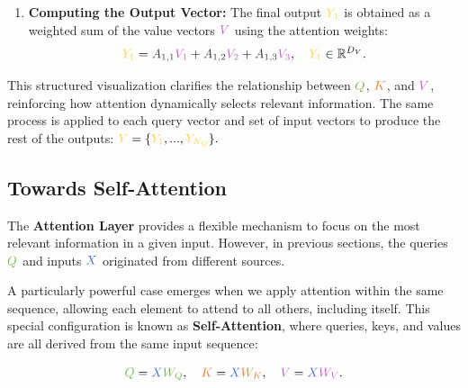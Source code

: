 \begin{enumerate}
    \item \textbf{Computing the Output Vector:} The final output \(\textcolor[rgb]{1.0,0.816,0.267}{Y_1}\) is obtained as a weighted sum of the value vectors \(\textcolor[rgb]{0.769,0.369,0.800}{V}\) using the attention weights:
    \begin{equation}
        \textcolor[rgb]{1.0,0.816,0.267}{Y_1} = \textcolor[rgb]{0.236,0.236,0.236}{A_{1,1}} \textcolor[rgb]{0.769,0.369,0.800}{V_1} + \textcolor[rgb]{0.236,0.236,0.236}{A_{1,2}} \textcolor[rgb]{0.769,0.369,0.800}{V_2} + \textcolor[rgb]{0.236,0.236,0.236}{A_{1,3}} \textcolor[rgb]{0.769,0.369,0.800}{V_3}, \quad \textcolor[rgb]{1.0,0.816,0.267}{Y_1} \in \mathbb{R}^{D_V}.
    \end{equation}
\end{enumerate}

\noindent This structured visualization clarifies the relationship between \(\textcolor[rgb]{0.471,0.694,0.318}{Q}\), \(\textcolor[rgb]{0.929,0.502,0.212}{K}\), and \(\textcolor[rgb]{0.769,0.369,0.800}{V}\), reinforcing how attention dynamically selects relevant information. The same process is applied to each query vector and set of input vectors to produce the rest of the outputs: $\textcolor[rgb]{1.0,0.816,0.267}{Y} = \{\textcolor[rgb]{1.0,0.816,0.267}{Y_1}, ..., \textcolor[rgb]{1.0,0.816,0.267}{Y_{N_Q}}\}.$


\subsection{Towards Self-Attention}
\noindent The \textbf{Attention Layer} provides a flexible mechanism to focus on the most relevant information in a given input. However, in previous sections, the queries \(\textcolor[rgb]{0.471,0.694,0.318}{Q}\) and inputs \(\textcolor[rgb]{0.267,0.447,0.769}{X}\) originated from different sources. 

\noindent A particularly powerful case emerges when we apply attention within the same sequence, allowing each element to attend to all others, including itself. This special configuration is known as \textbf{Self-Attention}, where queries, keys, and values are all derived from the same input sequence:

\[
\textcolor[rgb]{0.471,0.694,0.318}{Q} = \textcolor[rgb]{0.267,0.447,0.769}{X} \textcolor[rgb]{0.471,0.694,0.318}{W_Q}, \quad
\textcolor[rgb]{0.929,0.502,0.212}{K} = \textcolor[rgb]{0.267,0.447,0.769}{X} \textcolor[rgb]{0.929,0.502,0.212}{W_K}, \quad
\textcolor[rgb]{0.769,0.369,0.800}{V} = \textcolor[rgb]{0.267,0.447,0.769}{X} \textcolor[rgb]{0.769,0.369,0.800}{W_V}.
\]

